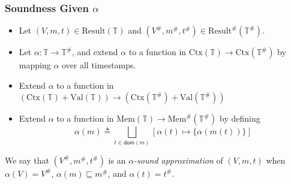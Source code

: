 \documentclass{beamer}
\newcommand*{\A}[1]{{#1}^{\#}}
\newcommand*{\Time}{\mathbb{T}}
\newcommand*{\ATime}{\A{\Time}}
\newcommand*{\Ctx}[1]{\text{Ctx}({#1})}
\newcommand*{\Value}[1]{\text{Val}({#1})}
\newcommand*{\Mem}[1]{\text{Mem}({#1})}
\newcommand*{\mem}{m}
\newcommand*{\AMem}[1]{\A{\text{Mem}}({#1})}
\newcommand*{\Result}[1]{\text{Result}({#1})}
\newcommand*{\AResult}[1]{\A{\text{Result}}({#1})}
\begin{document}
\begin{frame}[c]
  \frametitle{Soundness Given $\alpha$}
  \begin{definition}
    \begin{itemize}
      \item Let $(V,\mem,t)\in\Result{\Time}$ and $(\A{V},\A\mem,\A{t})\in\AResult{\ATime}$.
      \item Let $\alpha:\Time\rightarrow\ATime$, and extend $\alpha$ to a function in $\Ctx{\Time}\rightarrow\Ctx{\ATime}$ by mapping $\alpha$ over all timestamps.
      \item Extend $\alpha$ to a function in $(\Ctx{\Time}+\Value{\Time})\rightarrow(\Ctx{\ATime}+\Value{\ATime})$
      \item Extend $\alpha$ to a function in $\Mem{\Time}\rightarrow\AMem{\ATime}$ by defining
            \[\alpha(\mem)\triangleq\bigsqcup_{t\in\mathsf{dom}(\mem)}[\alpha(t)\mapsto\{\alpha(\mem(t))\}]\]
    \end{itemize}

    We say that $(\A{V},\A\mem,\A{t})$ is an \emph{$\alpha$-sound approximation} of $(V,\mem,t)$ when $\alpha(V)=\A{V}$, $\alpha(\mem)\sqsubseteq\A\mem$, and $\alpha(t)=\A{t}$.
  \end{definition}
\end{frame}
\end{document}

